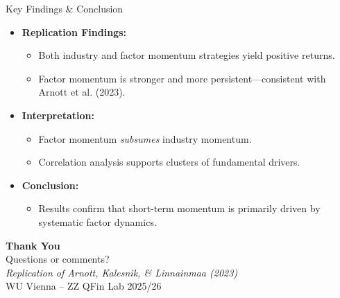 \documentclass[t]{beamer}
\begin{document}
\begin{frame}{Key Findings \& Conclusion}
\begin{itemize}
    \item \textbf{Replication Findings:}
    \begin{itemize}
        \item Both industry and factor momentum strategies yield positive returns.
        \item Factor momentum is stronger and more persistent—consistent with Arnott et al. (2023).
    \end{itemize}
    \item \textbf{Interpretation:}
    \begin{itemize}
        \item Factor momentum \textit{subsumes} industry momentum.
        \item Correlation analysis supports clusters of fundamental drivers.
    \end{itemize}
    \item \textbf{Conclusion:}
    \begin{itemize}
        \item Results confirm that short-term momentum is primarily driven by systematic factor dynamics.
    \end{itemize}
\end{itemize}
\end{frame}

\begin{frame}[plain]
    \centering
    \vspace{2cm}
    {\Huge \textbf{Thank You}} \\[0.5cm]
    \Large Questions or comments? \\[1cm]
    \normalsize
    \textit{Replication of Arnott, Kalesnik, \& Linnainmaa (2023)} \\
    WU Vienna – ZZ QFin Lab 2025/26 
\end{frame}
\end{document}
